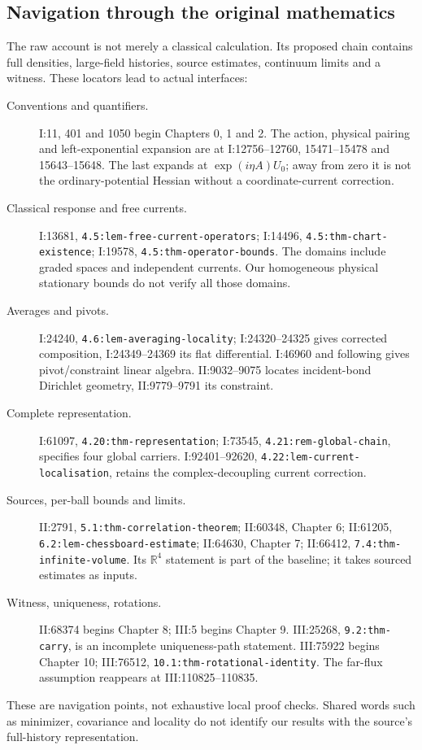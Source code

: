 \documentclass[11pt]{article}
\providecommand{\hrbpath}[1]{\nolinkurl{#1}}
\theoremstyle{remark}
\begin{document}
\subsection{Navigation through the original mathematics}
\label{hrb-raw-map}

The raw account is not merely a classical calculation.
Its proposed chain contains full densities, large-field
histories, source estimates, continuum limits and a
witness. These locators lead to actual interfaces:
\begin{description}
\item[Conventions and quantifiers.]
I:11, 401 and 1050 begin Chapters 0, 1 and 2.
The action, physical pairing and left-exponential
expansion are at I:12756--12760, 15471--15478 and
15643--15648. The last expands at \(\exp(i\eta A)U_0\);
away from zero it is not the ordinary-potential
Hessian without a coordinate-current correction.
\item[Classical response and free currents.]
I:13681, \hrbpath{4.5:lem-free-current-operators};
I:14496, \hrbpath{4.5:thm-chart-existence};
I:19578, \hrbpath{4.5:thm-operator-bounds}.
The domains include graded spaces and independent
currents. Our homogeneous physical stationary
bounds do not verify all those domains.
\item[Averages and pivots.]
I:24240, \hrbpath{4.6:lem-averaging-locality};
I:24320--24325 gives corrected composition,
I:24349--24369 its flat differential.
I:46960 and following gives pivot/constraint
linear algebra. II:9032--9075 locates incident-bond
Dirichlet geometry, II:9779--9791 its constraint.
\item[Complete representation.]
I:61097, \hrbpath{4.20:thm-representation};
I:73545, \hrbpath{4.21:rem-global-chain},
specifies four global carriers.
I:92401--92620, \hrbpath{4.22:lem-current-localisation},
retains the complex-decoupling current correction.
\item[Sources, per-ball bounds and limits.]
II:2791, \hrbpath{5.1:thm-correlation-theorem};
II:60348, Chapter 6;
II:61205, \hrbpath{6.2:lem-chessboard-estimate};
II:64630, Chapter 7;
II:66412, \hrbpath{7.4:thm-infinite-volume}.
Its \(\mathbb R^4\) statement is part of the baseline;
it takes sourced estimates as inputs.
\item[Witness, uniqueness, rotations.]
II:68374 begins Chapter 8; III:5 begins Chapter 9.
III:25268, \hrbpath{9.2:thm-carry}, is an incomplete
uniqueness-path statement. III:75922 begins Chapter 10;
III:76512, \hrbpath{10.1:thm-rotational-identity}.
The far-flux assumption reappears at
III:110825--110835.
\end{description}
These are navigation points, not exhaustive local
proof checks. Shared words such as minimizer, covariance
and locality do not identify our results with the
source's full-history representation.
\end{document}
